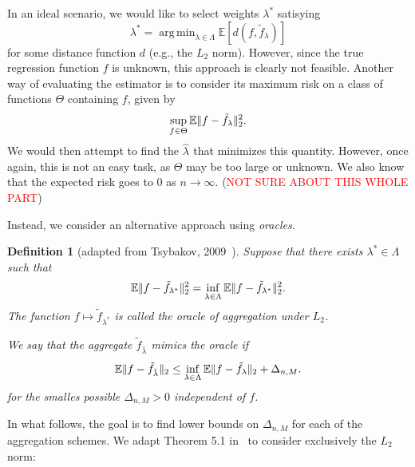 \documentclass[12pt, letter paper]{article}
\newcommand{\1}{\mathmybb{1}}
\newtheorem{definition}{Definition}[section]
\DeclareMathOperator*{\argmin}{arg\,min}
\newcommand{\0}{\emptyset}
\newcommand{\E}{\mathbb{E}}
\newcommand{\Ep}[1]{\mathbb{E}\left[ #1 \right]}
\newcommand{\paren}[1]{\left(#1 \right)}
\newcommand{\norm}[1]{|\hspace{-1pt}|#1 |\hspace{-1pt}|}
\newcommand{\normsq}[1]{\norm{#1}^{2}}
\newcommand{\ftilde}[1]{\tilde{f}_{#1}}
\newcommand{\lambdahat}[1]{\hat{\lambda}_{#1}}
\begin{document}
In an ideal scenario, we would like to select  weights \(\lambda^*\) satisying 
\[\lambda^{*} = \argmin_{\lambda\in\Lambda}\Ep{d\paren{f, \ftilde{\lambda}}}\]
for some distance function \(d\) (e.g., the \(L_{2}\) norm). However, since the true regression function \(f\) is unknown, this approach is clearly not feasible. Another way of evaluating the estimator is to consider its maximum risk on a class of functions \(\Theta\) containing \(f\), given by 
\[\sup_{f\in\Theta}\E\normsq{f-\ftilde{\lambda}}_{2}.\]
We would then attempt to find the \(\lambdahat{}\) that minimizes this quantity. However, once again, this is not an easy task, as \(\Theta\) may be too large or unknown. We also know that the expected risk goes to 0 as \(n\to \infty\). (\textcolor{red}{NOT SURE ABOUT THIS WHOLE PART})

Instead, we consider an alternative approach using \emph{oracles.} 

\begin{definition}[adapted from Tsybakov, 2009~\cite{tsybakov_introduction_2009}]
    Suppose that there exists \(\lambda^{*}\in\Lambda\) such that 
    \[\E\normsq{f-\ftilde{\lambda^{*}}}_{2} = \inf_{\lambda\in\Lambda}\E\normsq{f-\ftilde{\lambda^{*}}}_{2}.\]
    The function \(f\mapsto \ftilde{\lambda^{*}}\) is called the oracle of aggregation under \(L_{2}\).

    We say that the aggregate \(\ftilde{\lambdahat{}}\) \emph{mimics} the oracle if
    \begin{equation}\label{eq:oracleineq}
        \E\norm{f - \ftilde{\lambdahat{}}}_{2} \leq \inf_{\lambda\in\Lambda}\E\norm{f - \ftilde{\lambda}}_{2} + \Delta_{n,M}.
    \end{equation}
    for the smalles possible \(\Delta_{n,M}>0\) independent of \(f\).
\end{definition}

In what follows, the goal is to find lower bounds on \(\Delta_{n,M}\) for each of the aggregation schemes. We adapt Theorem 5.1 in~\cite{bunea_2007} to consider exclusively the \(L_{2}\) norm:
\end{document}
